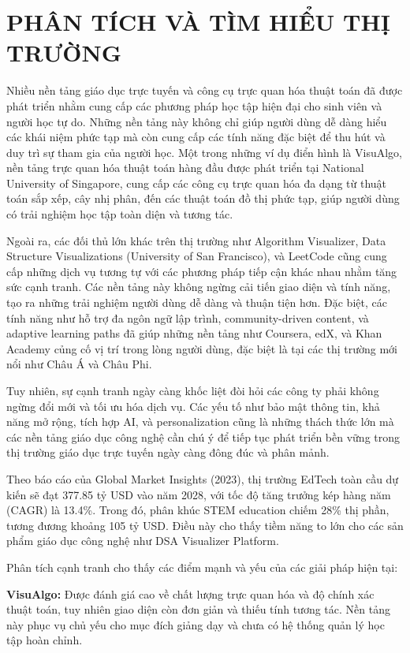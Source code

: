 \chapter{PHÂN TÍCH VÀ TÌM HIỂU THỊ TRƯỜNG}
\label{ch:market-analysis}

Nhiều nền tảng giáo dục trực tuyến và công cụ trực quan hóa thuật toán đã được phát triển nhằm cung cấp các phương pháp học tập hiện đại cho sinh viên và người học tự do. Những nền tảng này không chỉ giúp người dùng dễ dàng hiểu các khái niệm phức tạp mà còn cung cấp các tính năng đặc biệt để thu hút và duy trì sự tham gia của người học. Một trong những ví dụ điển hình là VisuAlgo, nền tảng trực quan hóa thuật toán hàng đầu được phát triển tại National University of Singapore, cung cấp các công cụ trực quan hóa đa dạng từ thuật toán sắp xếp, cây nhị phân, đến các thuật toán đồ thị phức tạp, giúp người dùng có trải nghiệm học tập toàn diện và tương tác.

Ngoài ra, các đối thủ lớn khác trên thị trường như Algorithm Visualizer, Data Structure Visualizations (University of San Francisco), và LeetCode cũng cung cấp những dịch vụ tương tự với các phương pháp tiếp cận khác nhau nhằm tăng sức cạnh tranh. Các nền tảng này không ngừng cải tiến giao diện và tính năng, tạo ra những trải nghiệm người dùng dễ dàng và thuận tiện hơn. Đặc biệt, các tính năng như hỗ trợ đa ngôn ngữ lập trình, community-driven content, và adaptive learning paths đã giúp những nền tảng như Coursera, edX, và Khan Academy củng cố vị trí trong lòng người dùng, đặc biệt là tại các thị trường mới nổi như Châu Á và Châu Phi.

Tuy nhiên, sự cạnh tranh ngày càng khốc liệt đòi hỏi các công ty phải không ngừng đổi mới và tối ưu hóa dịch vụ. Các yếu tố như bảo mật thông tin, khả năng mở rộng, tích hợp AI, và personalization cũng là những thách thức lớn mà các nền tảng giáo dục công nghệ cần chú ý để tiếp tục phát triển bền vững trong thị trường giáo dục trực tuyến ngày càng đông đúc và phân mảnh.

Theo báo cáo của Global Market Insights (2023), thị trường EdTech toàn cầu dự kiến sẽ đạt 377.85 tỷ USD vào năm 2028, với tốc độ tăng trưởng kép hàng năm (CAGR) là 13.4\%. Trong đó, phân khúc STEM education chiếm 28\% thị phần, tương đương khoảng 105 tỷ USD. Điều này cho thấy tiềm năng to lớn cho các sản phẩm giáo dục công nghệ như DSA Visualizer Platform.

Phân tích cạnh tranh cho thấy các điểm mạnh và yếu của các giải pháp hiện tại:

\textbf{VisuAlgo:} Được đánh giá cao về chất lượng trực quan hóa và độ chính xác thuật toán, tuy nhiên giao diện còn đơn giản và thiếu tính tương tác. Nền tảng này phục vụ chủ yếu cho mục đích giảng dạy và chưa có hệ thống quản lý học tập hoàn chỉnh.

